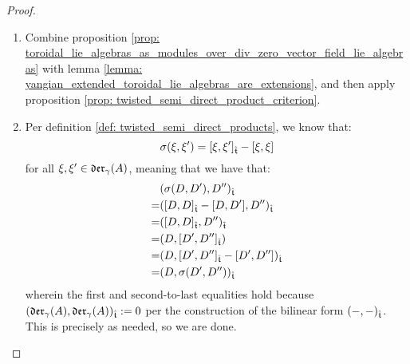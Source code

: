             \begin{proof}
                \begin{enumerate}
                    \item Combine proposition \ref{prop: toroidal_lie_algebras_as_modules_over_div_zero_vector_field_lie_algebras} with lemma \ref{lemma: yangian_extended_toroidal_lie_algebras_are_extensions}, and then apply proposition \ref{prop: twisted_semi_direct_product_criterion}.
                    \item Per definition \ref{def: twisted_semi_direct_products}, we know that:
                        $$\sigma(\xi, \xi') = [\xi, \xi']_{\hat{\mathfrak{t}}} - [\xi, \xi]$$
                    for all $\xi, \xi' \in \mathfrak{der}_{\gamma}(A)$, meaning that we have that:
                        $$
                            \begin{aligned}
                                & (\sigma(D, D'), D'')_{\hat{\mathfrak{t}}}
                                \\
                                = & ([D, D]_{\hat{\mathfrak{t}}} - [D, D'], D'')_{\hat{\mathfrak{t}}}
                                \\
                                = & ([D, D]_{\hat{\mathfrak{t}}}, D'')_{\hat{\mathfrak{t}}} 
                                \\
                                = & (D, [D', D'']_{\hat{\mathfrak{t}}})
                                \\
                                = & (D, [D', D'']_{\hat{\mathfrak{t}}} - [D', D''])_{\hat{\mathfrak{t}}}
                                \\
                                = & (D, \sigma(D', D''))_{\hat{\mathfrak{t}}}
                            \end{aligned}
                        $$
                    wherein the first and second-to-last equalities hold because $(\mathfrak{der}_{\gamma}(A), \mathfrak{der}_{\gamma}(A))_{\hat{\mathfrak{t}}} := 0$ per the construction of the bilinear form $(-, -)_{\hat{\mathfrak{t}}}$. This is precisely as needed, so we are done.
                \end{enumerate}
            \end{proof}